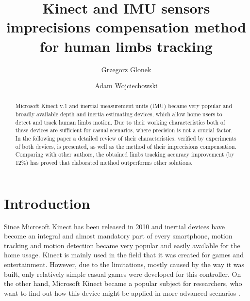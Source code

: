 \documentclass{llncs}
\begin{document}
	
\title{Kinect and IMU sensors imprecisions compensation method for human limbs tracking}
	
	
\author{Grzegorz Glonek \and Adam Wojciechowski}
	
	

	
\maketitle            
\begin{abstract}
	Microsoft Kinect v.1 and inertial measurement units (IMU) became very popular and broadly available depth and inertia estimating devices, which allow home users to detect and track human limbs motion. Due to their working characteristics both of these devices are sufficient for casual scenarios, where precision is not a crucial factor. In the following paper a detailed review of their characteristics, verified by experiments of both devices, is presented, as well as the method of their imprecisions compensation. Comparing with other authors, the obtained limbs tracking accuracy improvement (by 12\%) has proved that elaborated method outperforms other solutions. 
\end{abstract}
	
\section{Introduction}
Since Microsoft Kinect has been released in 2010 and inertial devices have become an integral and almost mandatory part of every smartphone, motion tracking and motion detection became very popular and easily available for the home usage. Kinect is mainly used in the field that it was created for games and entertainment. However, due to the limitations, mostly caused by the way it was built, only relatively simple casual games were developed for this controller. On the other hand, Microsoft Kinect became a popular subject for researchers, who want to find out how this device might be applied in more advanced scenarios \cite{Lange2012,Chang2011}. 
\end{document}
